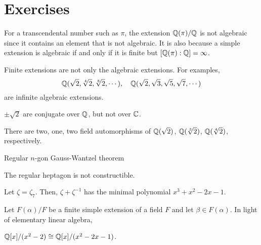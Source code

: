 \documentclass{../../large}
\begin{document}
\section*{Exercises}





\begin{ex}
For a transcendental number such as $\pi$, the extension $\mathbb{Q}(\pi)/\mathbb{Q}$ is not algebraic since it contains an element that is not algebraic.
It is also because a simple extension is algebraic if and only if it is finite but $[\mathbb{Q}(\pi):\mathbb{Q}]=\infty$.
\end{ex}

\begin{ex}
Finite extensions are not only the algebraic extensions.
For examples,
\[\mathbb{Q}(\sqrt2,\sqrt[4]2,\sqrt[8]2,\cdots),\quad\mathbb{Q}(\sqrt2,\sqrt3,\sqrt5,\sqrt7,\cdots)\]
are infinite algebraic extensions.
\end{ex}

\begin{ex}
$\pm\sqrt2$ are conjugate over $\mathbb{Q}$, but not over $\mathbb{C}$.

There are two, one, two field automorphisms of $\mathbb{Q}(\sqrt2)$, $\mathbb{Q}(\sqrt[3]2)$, $\mathbb{Q}(\sqrt[4]2)$, respectively.
\end{ex}



\begin{prb}
Regular $n$-gon
Gauss-Wantzel theorem
\begin{parts}
\item The regular heptagon is not constructible.
\end{parts}
\end{prb}
\begin{pf}
Let $\zeta=\zeta_7$.
Then, $\zeta+\zeta^{-1}$ has the minimal polynomial $x^3+x^2-2x-1$.
\end{pf}



\begin{prb}
Let $F(\alpha)/F$ be a finite simple extension of a field $F$ and let $\beta\in F(\alpha)$.
In light of elementary linear algebra,
\end{prb}

\begin{prb}
$\mathbb{Q}[x]/(x^2-2)\cong\mathbb{Q}[x]/(x^2-2x-1)$.
\end{prb}
\end{document}

